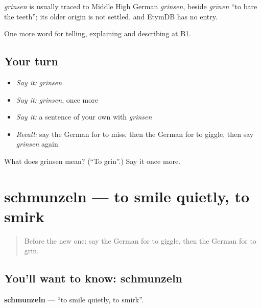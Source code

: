 \begin{cousinweb}
\emph{grinsen} is usually traced to Middle High German \emph{grinsen}, beside \emph{grīnen} \textquotedblleft{}to bare the teeth\textquotedblright{}; its older origin is not settled, and EtymDB has no entry.
\end{cousinweb}

\begin{grammarlens}[title={What you've built}]
One more word for telling, explaining and describing at B1.
\end{grammarlens}

\subsection*{Your turn}
\begin{itemize}
\raggedright
  \item \emph{Say it:} \emph{grinsen}
  \item \emph{Say it:} \emph{grinsen}, once more
  \item \emph{Say it:} a sentence of your own with \emph{grinsen}
  \item \emph{Recall:} say the German for to miss, then the German for to giggle, then say \emph{grinsen} again
\end{itemize}

\begin{tcolorbox}[breakable,colback=teal!4,colframe=teal!35!black,title={Before you move on}]
What does grinsen mean? (\textquotedblleft{}To grin\textquotedblright{}.) Say it once more.
\end{tcolorbox}
\section[schmunzeln]{schmunzeln — to smile quietly, to smirk}

\label{lesson:GE-C473-schmunzeln}



\begin{quote}
Before the new one: say the German for to giggle, then the German for to grin.
\end{quote}

\subsection*{You'll want to know: schmunzeln}
\textbf{schmunzeln} — \textquotedblleft{}to smile quietly, to smirk\textquotedblright{}.

